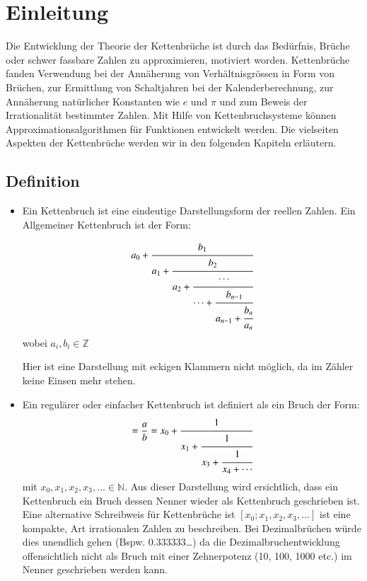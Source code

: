 %
%
%
\section{Einleitung\label{kettenbruch:section:einleitung}}
Die Entwicklung der Theorie der Kettenbrüche ist durch das Bedürfnis,
Brüche oder schwer fassbare Zahlen zu approximieren, motiviert
worden. Kettenbrüche fanden Verwendung bei der Annäherung von
Verhältnisgrössen in Form von Brüchen, zur Ermittlung von Schaltjahren
bei der Kalenderberechnung, zur Annäherung natürlicher Konstanten
wie $e$ und $\pi$ und zum Beweis der Irrationalität bestimmter
Zahlen. Mit Hilfe von Kettenbruchsysteme können Approximationsalgorithmen 
für Funktionen entwickelt werden. Die vielseiten Aspekten der Kettenbrüche
werden wir in den folgenden Kapiteln erläutern.

\subsection{Definition\label{kettenbruch:section:1s}}
\begin{itemize}
\item
Ein Kettenbruch ist eine eindeutige Darstellungsform der reellen Zahlen. 
Ein Allgemeiner Kettenbruch ist der Form:
\begin{beispiel}
\begin{equation}
a_0 + \cfrac{b_1}{a_1+\cfrac{b_2}{a_2+\cfrac{\cdots}{\cdots+\cfrac{b_{n-1}}{a_{n-1} + \cfrac{b_n}{a_n}}}}}
\end{equation}
wobei $a_i, b_i \in \mathbb{Z}$
\end{beispiel}
Hier ist eine Darstellung mit eckigen Klammern nicht möglich, da im Zähler keine Einsen mehr stehen.
\item
Ein regulärer oder einfacher Kettenbruch ist definiert als ein Bruch der Form:
\begin{align*}
[x_0;x_1,x_2,\cdots,x_n]
=
\frac{a}{b}=x_0+\cfrac{1}{x_1+\cfrac{1}{x_3+\cfrac{1}{x_4+\cdots}}}
\end{align*}
mit $x_0,x_1,x_2,x_3, \dots \in \mathbb{N}$.
Aus dieser Darstellung wird ersichtlich, dass ein Kettenbruch ein Bruch dessen 
Nenner wieder als Kettenbruch geschrieben ist.
Eine alternative Schreibweis für Kettenbrüche ist $[x_0;x_1,x_2,x_3,\dots]$ 
ist eine kompakte, Art irrationalen Zahlen  zu beschreiben. 
Bei Dezimalbrüchen würde dies unendlich gehen (Bspw. 0.333333\dots) da die Dezimalbruchentwicklung offensichtlich nicht als Bruch mit einer Zehnerpotenz (10, 100, 1000 etc.) im Nenner  geschrieben werden kann.
\end{itemize}

